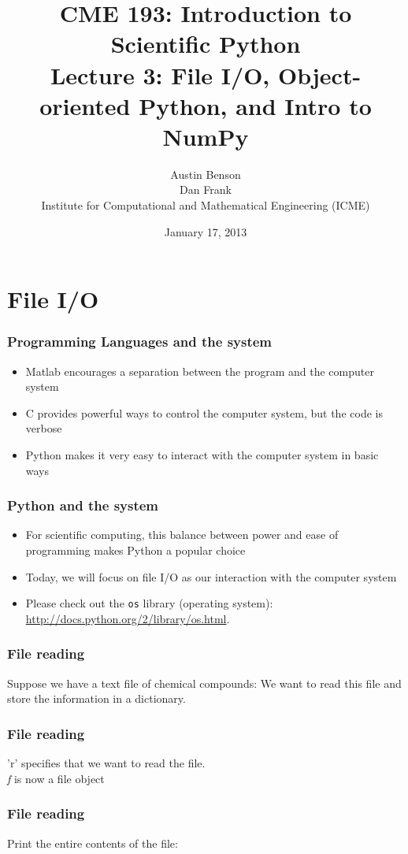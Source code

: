 \documentclass{beamer}
\title{CME 193: Introduction to Scientific Python \\
Lecture 3: File I/O, Object-oriented Python, and Intro to NumPy}
\author{Austin Benson \\
\vspace{0.1in}
Dan Frank \\
\vspace{0.1in}
Institute for Computational and Mathematical Engineering (ICME)}
\date{January 17, 2013}
\begin{document}
\maketitle

\section{File I/O}
\begin{frame}
\frametitle{Programming Languages and the system}
\begin{itemize}
\setlength{\itemsep}{0.1in}
\item{Matlab encourages a separation between the program and the computer system}
\item{C provides powerful ways to control the computer system, but the code is verbose}
\item{Python makes it very easy to interact with the computer system in basic ways}
\end{itemize}
\end{frame}

\begin{frame}
\frametitle{Python and the system}
\begin{itemize}
\setlength{\itemsep}{0.1in}
\item{For scientific computing, this balance between power and ease of programming makes Python a popular choice}
\item{Today, we will focus on file I/O as our interaction with the computer system}
\item{Please check out the \texttt{os} library (operating system): \url{http://docs.python.org/2/library/os.html}.}
\end{itemize}
\end{frame}

\begin{frame}
\frametitle{File reading}
Suppose we have a text file of chemical compounds:
We want to read this file and store the information in a dictionary.
\end{frame}

\begin{frame}
\frametitle{File reading}
'r'  specifies that we want to read the file. \\
\vspace{0.1in}
\emph{f} is now a file object
\end{frame}

\begin{frame}
\frametitle{File reading}
Print the entire contents of the file:
\end{frame}
\end{document}
